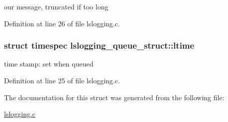 our message, truncated if too long 



Definition at line 26 of file lslogging.\-c.

\hypertarget{structlslogging__queue__struct_aa8211878c89f3c98757c3433115453eb}{
\subsubsection[{ltime}]{\setlength{\rightskip}{0pt plus 5cm}struct timespec lslogging\-\_\-queue\-\_\-struct\-::ltime}}\label{structlslogging__queue__struct_aa8211878c89f3c98757c3433115453eb}


time stamp\-: set when queued 



Definition at line 25 of file lslogging.\-c.



The documentation for this struct was generated from the following file\-:\begin{DoxyCompactItemize}
\item 
\hyperlink{lslogging_8c}{lslogging.\-c}\end{DoxyCompactItemize}
